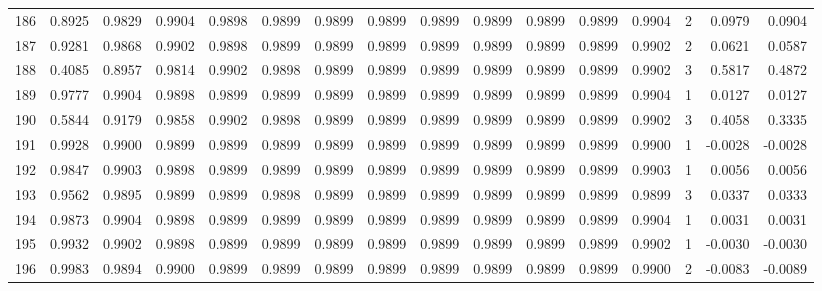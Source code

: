 \begin{tabular}{lrrrrrrrrrrrrrrr}
186 &      0.8925 &  0.9829 &  0.9904 &  0.9898 &  0.9899 &  0.9899 &  0.9899 &  0.9899 &  0.9899 &  0.9899 &   0.9899 &     0.9904 &      2 &                    0.0979 &                     0.0904 \\
187 &      0.9281 &  0.9868 &  0.9902 &  0.9898 &  0.9899 &  0.9899 &  0.9899 &  0.9899 &  0.9899 &  0.9899 &   0.9899 &     0.9902 &      2 &                    0.0621 &                     0.0587 \\
188 &      0.4085 &  0.8957 &  0.9814 &  0.9902 &  0.9898 &  0.9899 &  0.9899 &  0.9899 &  0.9899 &  0.9899 &   0.9899 &     0.9902 &      3 &                    0.5817 &                     0.4872 \\
189 &      0.9777 &  0.9904 &  0.9898 &  0.9899 &  0.9899 &  0.9899 &  0.9899 &  0.9899 &  0.9899 &  0.9899 &   0.9899 &     0.9904 &      1 &                    0.0127 &                     0.0127 \\
190 &      0.5844 &  0.9179 &  0.9858 &  0.9902 &  0.9898 &  0.9899 &  0.9899 &  0.9899 &  0.9899 &  0.9899 &   0.9899 &     0.9902 &      3 &                    0.4058 &                     0.3335 \\
191 &      0.9928 &  0.9900 &  0.9899 &  0.9899 &  0.9899 &  0.9899 &  0.9899 &  0.9899 &  0.9899 &  0.9899 &   0.9899 &     0.9900 &      1 &                   -0.0028 &                    -0.0028 \\
192 &      0.9847 &  0.9903 &  0.9898 &  0.9899 &  0.9899 &  0.9899 &  0.9899 &  0.9899 &  0.9899 &  0.9899 &   0.9899 &     0.9903 &      1 &                    0.0056 &                     0.0056 \\
193 &      0.9562 &  0.9895 &  0.9899 &  0.9899 &  0.9898 &  0.9899 &  0.9899 &  0.9899 &  0.9899 &  0.9899 &   0.9899 &     0.9899 &      3 &                    0.0337 &                     0.0333 \\
194 &      0.9873 &  0.9904 &  0.9898 &  0.9899 &  0.9899 &  0.9899 &  0.9899 &  0.9899 &  0.9899 &  0.9899 &   0.9899 &     0.9904 &      1 &                    0.0031 &                     0.0031 \\
195 &      0.9932 &  0.9902 &  0.9898 &  0.9899 &  0.9899 &  0.9899 &  0.9899 &  0.9899 &  0.9899 &  0.9899 &   0.9899 &     0.9902 &      1 &                   -0.0030 &                    -0.0030 \\
196 &      0.9983 &  0.9894 &  0.9900 &  0.9899 &  0.9899 &  0.9899 &  0.9899 &  0.9899 &  0.9899 &  0.9899 &   0.9899 &     0.9900 &      2 &                   -0.0083 &                    -0.0089 \\

\end{tabular}

